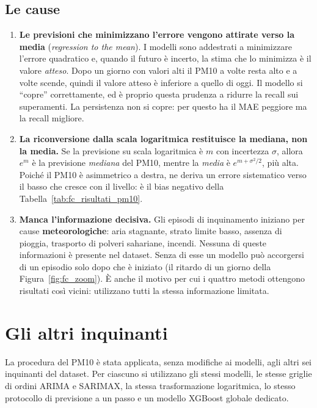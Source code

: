 \documentclass[11pt]{report}
\begin{document}
\subsection{Le cause}
\begin{enumerate}
  \item \textbf{Le previsioni che minimizzano l'errore vengono attirate verso la
        media} (\emph{regression to the mean}). I modelli sono addestrati a
        minimizzare l'errore quadratico e, quando il futuro è incerto, la stima
        che lo minimizza è il valore \emph{atteso}. Dopo un giorno con valori alti
        il PM10 a volte resta alto e a volte scende, quindi il valore atteso è
        inferiore a quello di oggi. Il modello si ``copre'' correttamente, ed è
        proprio questa prudenza a ridurre la recall sui superamenti. La
        persistenza non si copre: per questo ha il MAE peggiore ma la recall
        migliore.
  \item \textbf{La riconversione dalla scala logaritmica restituisce la mediana,
        non la media.} Se la previsione su scala logaritmica è $m$ con incertezza
        $\sigma$, allora $e^{m}$ è la previsione \emph{mediana} del PM10, mentre
        la \emph{media} è $e^{m+\sigma^2/2}$, più alta. Poiché il PM10 è
        asimmetrico a destra, ne deriva un errore sistematico verso il basso che
        cresce con il livello: è il bias negativo della
        Tabella~\ref{tab:fc_risultati_pm10}.
  \item \textbf{Manca l'informazione decisiva.} Gli episodi di inquinamento
        iniziano per cause \textbf{meteorologiche}: aria stagnante, strato limite
        basso, assenza di pioggia, trasporto di polveri sahariane, incendi.
        Nessuna di queste informazioni è presente nel dataset. Senza di esse un
        modello può accorgersi di un episodio solo dopo che è iniziato (il ritardo
        di un giorno della Figura~\ref{fig:fc_zoom}). È anche il motivo per cui i
        quattro metodi ottengono risultati così vicini: utilizzano tutti la stessa
        informazione limitata.
\end{enumerate}

\section{Gli altri inquinanti}
\label{sec:fc_altri}

La procedura del PM10 è stata applicata, senza modifiche ai modelli, agli altri sei
inquinanti del dataset. Per ciascuno si utilizzano gli stessi modelli, le stesse
griglie di ordini ARIMA e SARIMAX, la stessa trasformazione logaritmica, lo stesso
protocollo di previsione a un passo e un modello XGBoost globale dedicato.
\end{document}
